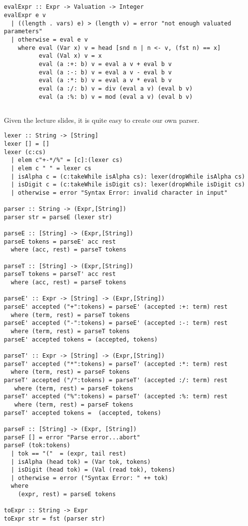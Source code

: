 \documentclass[a4paper,11pt]{article}
\begin{document}
\subsection{}
\begin{lstlisting}
evalExpr :: Expr -> Valuation -> Integer
evalExpr e v
  | ((length . vars) e) > (length v) = error "not enough valuated parameters"
  | otherwise = eval e v
    where eval (Var x) v = head [snd n | n <- v, (fst n) == x] 
          eval (Val x) v = x
          eval (a :+: b) v = eval a v + eval b v
          eval (a :-: b) v = eval a v - eval b v
          eval (a :*: b) v = eval a v * eval b v
          eval (a :/: b) v = div (eval a v) (eval b v)
          eval (a :%: b) v = mod (eval a v) (eval b v)
\end{lstlisting}

\subsection{}
Given the lecture slides, it is quite easy to create our own parser. 

\begin{lstlisting}
lexer :: String -> [String]
lexer [] = []
lexer (c:cs)
  | elem c"+-*/%" = [c]:(lexer cs)
  | elem c " " = lexer cs
  | isAlpha c = (c:takeWhile isAlpha cs): lexer(dropWhile isAlpha cs)
  | isDigit c = (c:takeWhile isDigit cs): lexer(dropWhile isDigit cs)
  | otherwise = error "Syntax Error: invalid character in input"
  
parser :: String -> (Expr,[String])
parser str = parseE (lexer str)

parseE :: [String] -> (Expr,[String])
parseE tokens = parseE' acc rest
  where (acc, rest) = parseT tokens

parseT :: [String] -> (Expr,[String])
parseT tokens = parseT' acc rest
  where (acc, rest) = parseF tokens 

parseE' :: Expr -> [String] -> (Expr,[String])
parseE' accepted ("+":tokens) = parseE' (accepted :+: term) rest
  where (term, rest) = parseT tokens
parseE' accepted ("-":tokens) = parseE' (accepted :-: term) rest
  where (term, rest) = parseT tokens
parseE' accepted tokens = (accepted, tokens)

parseT' :: Expr -> [String] -> (Expr,[String])
parseT' accepted ("*":tokens) = parseT' (accepted :*: term) rest
  where (term, rest) = parseF tokens
parseT' accepted ("/":tokens) = parseT' (accepted :/: term) rest
   where (term, rest) = parseF tokens
parseT' accepted ("%":tokens) = parseT' (accepted :%: term) rest
   where (term, rest) = parseF tokens
parseT' accepted tokens =  (accepted, tokens)

parseF :: [String] -> (Expr, [String])
parseF [] = error "Parse error...abort"
parseF (tok:tokens)
  | tok == "("  = (expr, tail rest)
  | isAlpha (head tok) = (Var tok, tokens)
  | isDigit (head tok) = (Val (read tok), tokens)
  | otherwise = error ("Syntax Error: " ++ tok)
  where
    (expr, rest) = parseE tokens

toExpr :: String -> Expr
toExpr str = fst (parser str)
\end{lstlisting}
\end{document}
